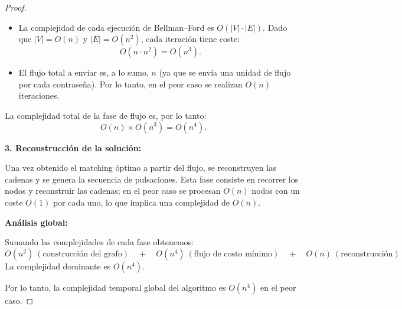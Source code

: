 ﻿\documentclass{article}
\theoremstyle{plain}
\theoremstyle{definition}
\begin{document}
\begin{proof}
\begin{itemize}
    \item La complejidad de cada ejecución de Bellman--Ford es \(O(|V|\cdot|E|)\). Dado que \(|V|=O(n)\) y \(|E|=O(n^2)\), cada iteración tiene coste:
    \[
    O(n\cdot n^2) = O(n^3).
    \]
    \item El flujo total a enviar es, a lo sumo, \(n\) (ya que se envía una unidad de flujo por cada contraseña). Por lo tanto, en el peor caso se realizan \(O(n)\) iteraciones.
\end{itemize}

La complejidad total de la fase de flujo es, por lo tanto:
\[
O(n) \times O(n^3) = O(n^4).
\]

\medskip

\textbf{3. Reconstrucción de la solución:}

Una vez obtenido el matching óptimo a partir del flujo, se reconstruyen las cadenas y se genera la secuencia de pulsaciones. Esta fase consiste en recorrer los nodos y reconstruir las cadenas; en el peor caso se procesan \(O(n)\) nodos con un coste \(O(1)\) por cada uno, lo que implica una complejidad de \(O(n)\).

\medskip

\textbf{Análisis global:}

Sumando las complejidades de cada fase obtenemos:
\[
O(n^2) \ (\text{construcción del grafo}) \quad + \quad O(n^4) \ (\text{flujo de costo mínimo}) \quad + \quad O(n) \ (\text{reconstrucción})
\]
La complejidad dominante es \(O(n^4)\).

\medskip

Por lo tanto, la complejidad temporal global del algoritmo es \(O(n^4)\) en el peor caso.
\end{proof}




\end{document}
